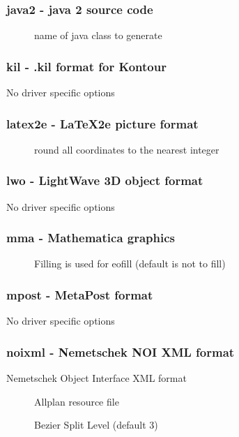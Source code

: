 \documentclass[english,a4paper]{article}
\begin{document}
\subsubsection{java2 - java 2 source code}
\begin{description}
\item[]
name of java class to generate


\end{description}
\subsubsection{kil - .kil format for Kontour}
No driver specific options
\subsubsection{latex2e - \LaTeX2e picture format}
\begin{description}
\item[]
round all coordinates to the nearest integer


\end{description}
\subsubsection{lwo - LightWave 3D object format}
No driver specific options
\subsubsection{mma - Mathematica graphics}
\begin{description}
\item[]
Filling is used for eofill (default is not to fill)


\end{description}
\subsubsection{mpost - MetaPost format}
No driver specific options
\subsubsection{noixml - Nemetschek NOI XML format}
Nemetschek Object Interface XML format

\begin{description}
\item[]
Allplan resource file


\item[]
Bezier Split Level (default 3)


\end{description}
\end{document}
